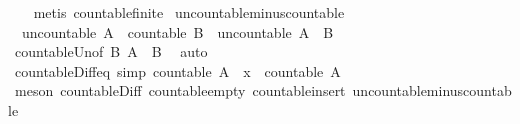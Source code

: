 \begin{isabellebody}
%
\isadelimproof
\ \ %
\endisadelimproof
%
\isatagproof
{}\isamarkupfalse%
\ {\isacharparenleft}metis\ countable{\isacharunderscore}finite{\isacharparenright}%
\endisatagproof
{\isafoldproof}%
%
\isadelimproof
\isanewline
%
\endisadelimproof
\isanewline
{}\isamarkupfalse%
\ uncountable{\isacharunderscore}minus{\isacharunderscore}countable{\isacharcolon}\isanewline
\ \ {\isachardoublequoteopen}uncountable\ A\ {\isasymLongrightarrow}\ countable\ B\ {\isasymLongrightarrow}\ uncountable\ {\isacharparenleft}A\ {\isacharminus}\ B{\isacharparenright}{\isachardoublequoteclose}\isanewline
%
\isadelimproof
\ \ %
\endisadelimproof
%
\isatagproof
{}\isamarkupfalse%
\ countable{\isacharunderscore}Un{\isacharbrackleft}of\ B\ {\isachardoublequoteopen}A\ {\isacharminus}\ B{\isachardoublequoteclose}{\isacharbrackright}\ \isamarkupfalse%
\ auto%
\endisatagproof
{\isafoldproof}%
%
\isadelimproof
\isanewline
%
\endisadelimproof
\isanewline
{}\isamarkupfalse%
\ countable{\isacharunderscore}Diff{\isacharunderscore}eq\ {\isacharbrackleft}simp{\isacharbrackright}{\isacharcolon}\ {\isachardoublequoteopen}countable\ {\isacharparenleft}A\ {\isacharminus}\ {\isacharbraceleft}x{\isacharbraceright}{\isacharparenright}\ {\isacharequal}\ countable\ A{\isachardoublequoteclose}\isanewline
%
\isadelimproof
\ \ %
\endisadelimproof
%
\isatagproof
{}\isamarkupfalse%
\ {\isacharparenleft}meson\ countable{\isacharunderscore}Diff\ countable{\isacharunderscore}empty\ countable{\isacharunderscore}insert\ uncountable{\isacharunderscore}minus{\isacharunderscore}countable{\isacharparenright}%
\endisatagproof
{\isafoldproof}%
%
\isadelimproof
\isanewline
%
\endisadelimproof
%
\isadelimtheory
\isanewline
%
\endisadelimtheory
%
\isatagtheory
{}\isamarkupfalse%
%
\endisatagtheory
{\isafoldtheory}%
%
\isadelimtheory
%
\endisadelimtheory
%
\end{isabellebody}%
\endinput
